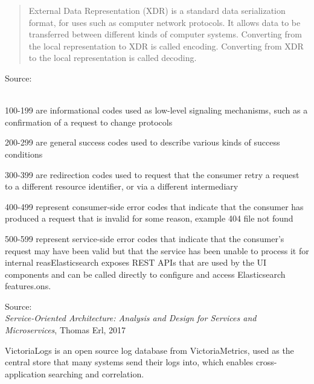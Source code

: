 \documentclass[Screen16to9,17pt]{foils}
\begin{document}


\begin{quote}
External Data Representation (XDR) is a standard data serialization format, for uses such as computer network protocols. It allows data to be transferred between different kinds of computer systems. Converting from the local representation to XDR is called encoding. Converting from XDR to the local representation is called decoding.
\end{quote}

Source: {\footnotesize\\
\\ }



\begin{list2}
\item 100-199 are informational codes used as low-level signaling mechanisms, such as a confirmation of a request to change protocols
\item 200-299 are general success codes used to describe various kinds of success conditions
\item 300-399 are redirection codes used to request that the consumer retry a request to a different resource identifier, or via a different intermediary
\item 400-499 represent consumer-side error codes that indicate that the consumer has produced a request that is invalid for some reason, example 404 file not found
\item 500-599 represent service-side error codes that indicate that the consumer’s request may have been valid but that the service has been unable to process it for internal reasElasticsearch exposes REST APIs that are used by the UI components and can be called directly to configure and access Elasticsearch features.ons.
\end{list2}
Source: {\footnotesize\\
\emph{Service‑Oriented Architecture: Analysis and Design for Services and Microservices}, Thomas Erl, 2017}




VictoriaLogs is an open source log database from VictoriaMetrics, used as the central store that many systems send their logs into, which enables cross-application searching and correlation.
\end{document}
